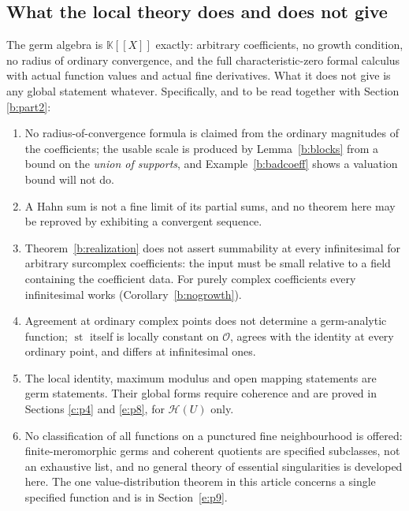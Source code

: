 \documentclass[11pt,a4paper]{article}
\numberwithin{equation}{section}
\theoremstyle{definition}
\theoremstyle{remark}
\theoremstyle{plain}
\newcommand{\K}{\mathbb K}
\newcommand{\Ov}{\mathcal O}
\DeclareMathOperator{\st}{st}
\newcommand{\Hc}{\mathcal H}
\begin{document}
\subsection{What the local theory does and does not give}

The germ algebra is $\K[[X]]$ exactly: arbitrary coefficients, no growth
condition, no radius of ordinary convergence, and the full
characteristic-zero formal calculus with actual function values and actual
fine derivatives. What it does not give is any global statement whatever.
Specifically, and to be read together with Section \ref{b:part2}:

\begin{enumerate}[label=\textup{(\arabic*)},leftmargin=2.4em]
\item No radius-of-convergence formula is claimed from the ordinary
magnitudes of the coefficients; the usable scale is produced by
Lemma~\ref{b:blocks} from a bound on the \emph{union of supports}, and
Example~\ref{b:badcoeff} shows a valuation bound will not do.
\item A Hahn sum is not a fine limit of its partial sums, and no theorem
here may be reproved by exhibiting a convergent sequence.
\item Theorem~\ref{b:realization} does not assert summability at every
infinitesimal for arbitrary surcomplex coefficients: the input must be
small relative to a field containing the coefficient data. For purely
complex coefficients every infinitesimal works
(Corollary~\ref{b:nogrowth}).
\item Agreement at ordinary complex points does not determine a
germ-analytic function; $\st$ itself is locally constant on $\Ov$, agrees
with the identity at every ordinary point, and differs at infinitesimal
ones.
\item The local identity, maximum modulus and open mapping statements are
germ statements. Their global forms require coherence and are proved in
Sections \ref{c:p4} and \ref{e:p8}, for $\Hc(U)$ only.
\item No classification of all functions on a punctured fine neighbourhood
is offered: finite-meromorphic germs and coherent quotients are specified
subclasses, not an exhaustive list, and no general theory of essential
singularities is developed here. The one value-distribution theorem in
this article concerns a single specified function and is in Section~\ref{e:p9}.
\end{enumerate}

\end{document}
